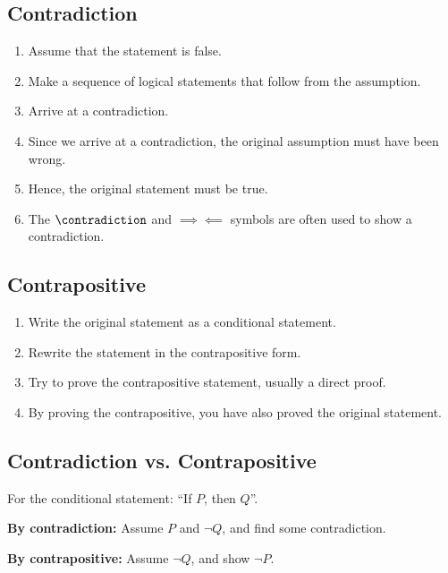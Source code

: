 \documentclass{article}
\begin{document}
\subsection{Contradiction}
\begin{enumerate}
    \item Assume that the statement is false.
    \item Make a sequence of logical statements that follow from the assumption.
    \item Arrive at a contradiction.
    \item Since we arrive at a contradiction, the original assumption must have been wrong.
    \item Hence, the original statement must be true.
    \item The \(\contradiction\) and \(\implies\!\!\!\!\impliedby\) symbols
          are often used to show a contradiction.
\end{enumerate}
%
\subsection{Contrapositive}
\begin{enumerate}
    \item Write the original statement as a conditional statement.
    \item Rewrite the statement in the contrapositive form.
    \item Try to prove the contrapositive statement, usually a direct proof.
    \item By proving the contrapositive, you have also proved the original statement.
\end{enumerate}
%
\subsection{Contradiction vs. Contrapositive}
For the conditional statement: ``If \(P\), then \(Q\)''.

\textbf{By contradiction:} Assume \(P\) and \(\neg{Q}\), and find some contradiction.

\textbf{By contrapositive:} Assume \(\neg{Q}\), and show \(\neg{P}\).
%
\end{document}
